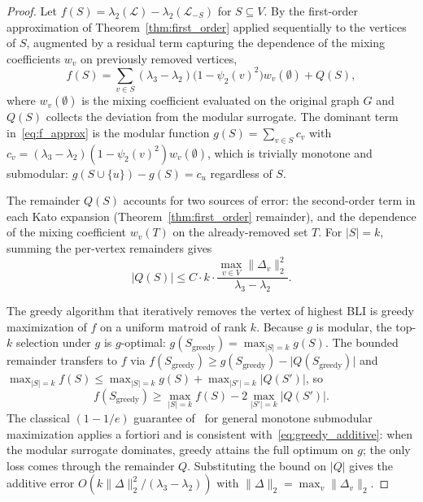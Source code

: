 \documentclass[12pt, a4paper]{article}
\begin{document}
\begin{proof}
Let $f(S) = \lambda_2(\mathcal{L}) - \lambda_2(\mathcal{L}_{-S})$ for $S \subseteq V$. By the first-order approximation of Theorem~\ref{thm:first_order} applied sequentially to the vertices of $S$, augmented by a residual term capturing the dependence of the mixing coefficients $w_v$ on previously removed vertices,
\begin{equation}\label{eq:f_approx}
f(S) = \sum_{v \in S} (\lambda_3 - \lambda_2)\bigl(1 - \psi_2(v)^2\bigr) w_v(\emptyset) + Q(S),
\end{equation}
where $w_v(\emptyset)$ is the mixing coefficient evaluated on the original graph $G$ and $Q(S)$ collects the deviation from the modular surrogate. The dominant term in~\eqref{eq:f_approx} is the modular function $g(S) = \sum_{v \in S} c_v$ with $c_v = (\lambda_3 - \lambda_2)(1 - \psi_2(v)^2) w_v(\emptyset)$, which is trivially monotone and submodular: $g(S \cup \{u\}) - g(S) = c_u$ regardless of $S$.

The remainder $Q(S)$ accounts for two sources of error: the second-order term in each Kato expansion (Theorem~\ref{thm:first_order} remainder), and the dependence of the mixing coefficient $w_v(T)$ on the already-removed set $T$. For $\lvert S \rvert = k$, summing the per-vertex remainders gives
\begin{equation}
\lvert Q(S) \rvert \leq C \cdot k \cdot \frac{\max_{v \in V} \lVert \Delta_v \rVert_2^2}{\lambda_3 - \lambda_2}.
\end{equation}

The greedy algorithm that iteratively removes the vertex of highest BLI is greedy maximization of $f$ on a uniform matroid of rank $k$. Because $g$ is modular, the top-$k$ selection under $g$ is $g$-optimal: $g(S_{\mathrm{greedy}}) = \max_{\lvert S \rvert = k} g(S)$. The bounded remainder transfers to $f$ via $f(S_{\mathrm{greedy}}) \geq g(S_{\mathrm{greedy}}) - \lvert Q(S_{\mathrm{greedy}}) \rvert$ and $\max_{\lvert S \rvert = k} f(S) \leq \max_{\lvert S \rvert = k} g(S) + \max_{\lvert S' \rvert = k} \lvert Q(S') \rvert$, so
\begin{equation}\label{eq:greedy_additive}
f(S_{\mathrm{greedy}}) \geq \max_{\lvert S \rvert = k} f(S) - 2 \max_{\lvert S' \rvert = k} \lvert Q(S') \rvert.
\end{equation}
The classical $(1 - 1/e)$ guarantee of~\citet{nemhauser1978analysis} for general monotone submodular maximization applies a fortiori and is consistent with~\eqref{eq:greedy_additive}: when the modular surrogate dominates, greedy attains the full optimum on $g$; the only loss comes through the remainder $Q$. Substituting the bound on $\lvert Q \rvert$ gives the additive error $O(k \lVert \Delta \rVert_2^2 / (\lambda_3 - \lambda_2))$ with $\lVert \Delta \rVert_2 = \max_v \lVert \Delta_v \rVert_2$.
\end{proof}
\end{document}
